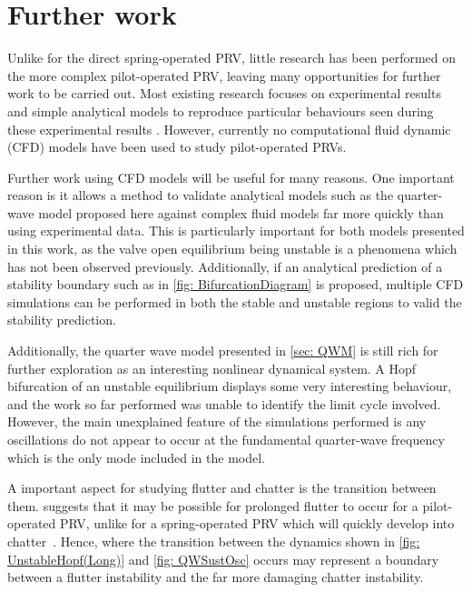 \chapter{Further work}

Unlike for the direct spring-operated PRV, little research has been performed on the more complex pilot-operated PRV, leaving many opportunities for further work to be carried out. Most existing research focuses on experimental results and simple analytical models to reproduce particular behaviours seen during these experimental results \cite{Botros1997Riser-ReliefInteractions,Zung2002NonlinearDesigners,Ye2009DynamicSystem,Allison2015TestingValves}. However, currently no computational fluid dynamic (CFD) models have been used to study pilot-operated PRVs.

Further work using CFD models will be useful for many reasons. One important reason is it allows a method to validate analytical models such as the quarter-wave model proposed here against complex fluid models far more quickly than using experimental data. This is particularly important for both models presented in this work, as the valve open equilibrium being unstable is a phenomena which has not been observed previously. Additionally, if an analytical prediction of a stability boundary such as in \cref{fig: BifurcationDiagram} is proposed, multiple CFD simulations can be performed in both the stable and unstable regions to valid the stability prediction.

Additionally, the quarter wave model presented in \cref{sec: QWM} is still rich for further exploration as an interesting nonlinear dynamical system. A Hopf bifurcation of an unstable equilibrium displays some very interesting behaviour, and the work so far performed was unable to identify the limit cycle involved. However, the main unexplained feature of the simulations performed is any oscillations do not appear to occur at the fundamental quarter-wave frequency which is the only mode included in the model.

A important aspect for studying flutter and chatter is the transition between them.  suggests that it may be possible for prolonged flutter to occur for a pilot-operated PRV, unlike for a spring-operated PRV which will quickly develop into chatter~\cite{Hos2016DynamicService}. Hence, where the transition between the dynamics shown in \cref{fig: UnstableHopf(Long)} and \cref{fig: QWSustOsc} occurs may represent a boundary between a flutter instability and the far more damaging chatter instability.


